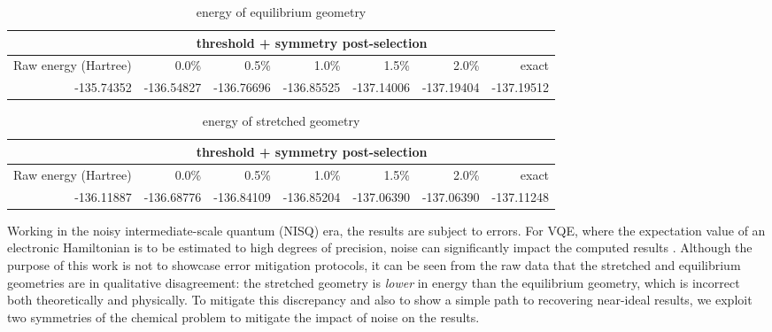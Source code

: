 \documentclass[journal,onecolumn]{IEEEtran}
\begin{document}


\begin{table}[!htb]
\caption{ energy of equilibrium geometry}
\centering
\begin{tabular}{lrrrrrr}
\hline
                               & \multicolumn{5}{c}{threshold + symmetry post-selection}        & \multicolumn{1}{l}{} \\ \hline
Raw energy (Hartree)           & 0.0\%      & 0.5\%      & 1.0\%      & 1.5\%      & 2.0\%      & exact                \\ \hline
\multicolumn{1}{r}{-135.74352} & -136.54827 & -136.76696 & -136.85525 & -137.14006 & -137.19404 & -137.19512           \\ \hline
\end{tabular}\label{tab:ch3f_equilibrium_energy}
\end{table}

\begin{table}[!htb]
\caption{ energy of stretched geometry}
\centering
\begin{tabular}{lrrrrrr}
\hline
                               & \multicolumn{5}{c}{threshold + symmetry post-selection}        & \multicolumn{1}{l}{} \\ \hline
Raw energy (Hartree)           & 0.0\%      & 0.5\%      & 1.0\%      & 1.5\%      & 2.0\%      & exact                \\ \hline
\multicolumn{1}{r}{-136.11887} & -136.68776 & -136.84109 & -136.85204 & -137.06390 & -137.06390 &   -137.11248    \\ \hline
\end{tabular}\label{tab:ch3f_stretched_energy}
\end{table}
Working in the noisy intermediate-scale quantum (NISQ) era, the results are subject to errors. 
For VQE, where the expectation value of an electronic Hamiltonian is to be estimated to high degrees of precision, noise can significantly impact the computed results \cite{peruzzo2014variational, OMalley2016-ph, Colless2018-hi, McCaskey2019-gk, Nam2020-ct, kandala2017hardware, Kandala2019-rz, Gao2019-pp, Rice2021-mn, Gao2021-zt, Zhao2023-um}. Although the purpose of this work is not to showcase error mitigation protocols, it can be seen from the raw data that the stretched and equilibrium geometries are in qualitative disagreement: the stretched geometry is \emph{lower} in energy than the equilibrium geometry, which is incorrect both theoretically and physically. 
To mitigate this discrepancy and also to show a simple path to recovering near-ideal results, we exploit two symmetries of the chemical problem to mitigate the impact of noise on the results.
\end{document}
